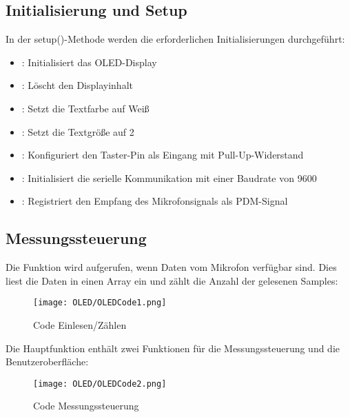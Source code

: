 \medskip




\subsection{Initialisierung und Setup}
In der setup()-Methode werden die erforderlichen Initialisierungen durchgeführt:

\begin{itemize}
    \item {}: Initialisiert das OLED-Display
    \item {}: Löscht den Displayinhalt
    \item {}: Setzt die Textfarbe auf Weiß
    \item {}: Setzt die Textgröße auf 2
    \item {}: Konfiguriert den Taster-Pin als Eingang mit Pull-Up-Widerstand
    \item {}: Initialisiert die serielle Kommunikation mit einer Baudrate von 9600
    \item {}: Registriert den Empfang des Mikrofonsignals als PDM-Signal
\end{itemize} 

\subsection{Messungssteuerung}
Die Funktion  wird aufgerufen, wenn Daten vom Mikrofon verfügbar sind. Dies liest die Daten in einen Array ein und zählt die Anzahl der gelesenen Samples:

\begin{figure}[h]
    \texttt{[image: OLED/OLEDCode1.png]}
    \caption{Code Einlesen/Zählen}
\end{figure}



Die Hauptfunktion  enthält zwei Funktionen für die Messungssteuerung und die Benutzeroberfläche:

\begin{figure}[h]
    \texttt{[image: OLED/OLEDCode2.png]}
    \caption{Code Messungssteuerung}
\end{figure}


